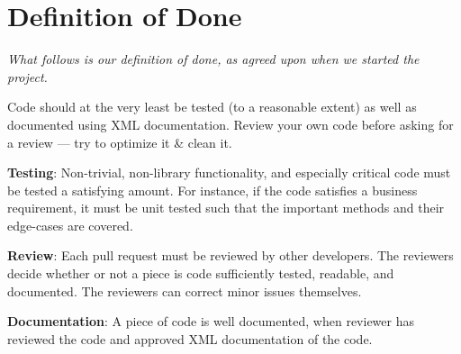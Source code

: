 \section{Definition of Done}\label{sec:definitionOfDone}
\textit{What follows is our definition of done, as agreed upon when we started the project.}

Code should at the very least be tested (to a reasonable extent) as well as documented using XML documentation. Review your own code before asking for a review --- try to optimize it \& clean it.

\textbf{Testing}: Non-trivial, non-library functionality, and especially critical code must be tested a satisfying amount. For instance, if the code satisfies a business requirement, it must be unit tested such that the important methods and their edge-cases are covered.  

\textbf{Review}: Each pull request must be reviewed by other developers. The reviewers decide whether or not a piece is code sufficiently tested, readable, and documented. The reviewers can correct minor issues themselves. 

\textbf{Documentation}: A piece of code is well documented, when reviewer has reviewed the code and approved XML documentation of the code.